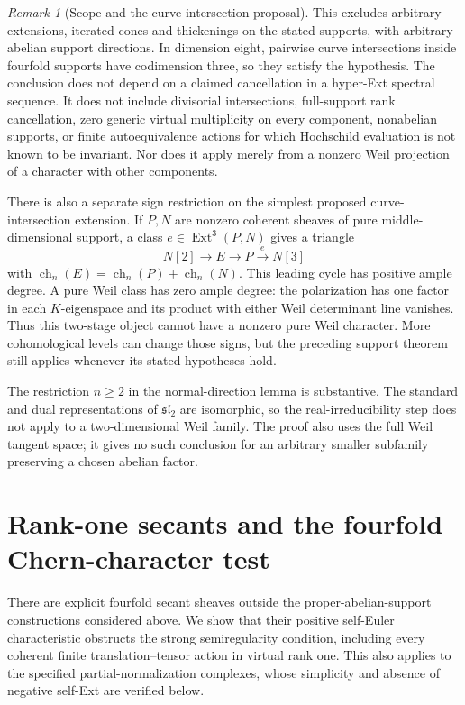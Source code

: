 \documentclass[11pt]{article}
\theoremstyle{definition}
\theoremstyle{remark}
\newtheorem{remark}[theorem]{Remark}
\begin{document}
\begin{remark}[Scope and the curve-intersection proposal]
This excludes arbitrary extensions, iterated cones and thickenings
on the stated supports, with arbitrary abelian support directions.
In dimension eight, pairwise curve intersections inside fourfold
supports have codimension three, so they satisfy the hypothesis.
The conclusion does not depend on a claimed cancellation in a
hyper-Ext spectral sequence.  It does not include divisorial
intersections, full-support rank cancellation, zero generic virtual
multiplicity on every component, nonabelian supports, or finite
autoequivalence actions for which Hochschild evaluation is not known
to be invariant.  Nor does it apply merely from a nonzero Weil
projection of a character with other components.

There is also a separate sign restriction on the simplest proposed
curve-intersection extension.  If $P,N$ are nonzero coherent sheaves
of pure middle-dimensional support, a class
$e\in\operatorname{Ext}^3(P,N)$ gives a triangle
\[
 N[2]\longrightarrow E\longrightarrow P\xrightarrow{e}N[3]
\]
with $\operatorname{ch}_n(E)=\operatorname{ch}_n(P)+
\operatorname{ch}_n(N)$.  This leading cycle has positive ample
degree.  A pure Weil class has zero ample degree: the polarization
has one factor in each $K$-eigenspace and its product with either
Weil determinant line vanishes.  Thus this two-stage object cannot
have a nonzero pure Weil character.  More cohomological levels can
change those signs, but the preceding support theorem still applies
whenever its stated hypotheses hold.

The restriction $n\geq2$ in the normal-direction lemma is
substantive.  The standard and dual representations of
$\mathfrak{sl}_2$ are isomorphic, so the real-irreducibility step
does not apply to a two-dimensional Weil family.  The proof also
uses the full Weil tangent space; it gives no such conclusion for
an arbitrary smaller subfamily preserving a chosen abelian factor.
\end{remark}


\section{Rank-one secants and the fourfold Chern-character test}
\label{sec:rank-one-fourfold-secants}

There are explicit fourfold secant sheaves outside the proper-abelian-support
constructions considered above.  We show that their positive self-Euler
characteristic obstructs the strong semiregularity condition, including
every coherent finite translation--tensor action in virtual rank one.
This also applies to the specified partial-normalization complexes, whose
simplicity and absence of negative self-Ext are verified below.
\end{document}
